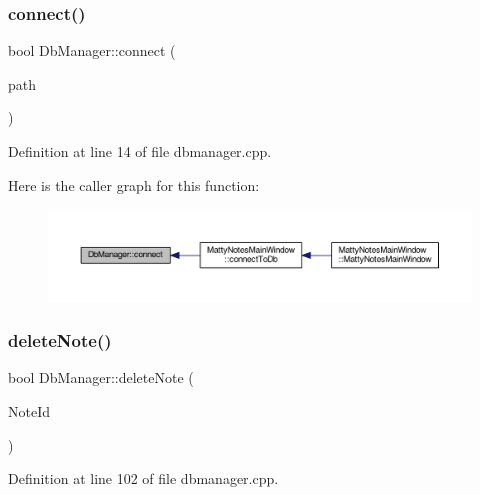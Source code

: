 \subsubsection{\texorpdfstring{connect()}{connect()}}
{\footnotesize\ttfamily bool Db\+Manager\+::connect (\begin{DoxyParamCaption}\item[{const Q\+String \&}]{path }\end{DoxyParamCaption})\hspace{0.3cm}{\ttfamily [static]}}



Definition at line 14 of file dbmanager.\+cpp.

Here is the caller graph for this function\+:
\nopagebreak
\begin{figure}[H]
\begin{center}
\leavevmode
\includegraphics[width=350pt]{classDbManager_abc90b3bf97dda268b4160a0662305898_icgraph}
\end{center}
\end{figure}
\hypertarget{classDbManager_a164849758fd05445c7af2cc04fc3569f}{}\label{classDbManager_a164849758fd05445c7af2cc04fc3569f} 
\subsubsection{\texorpdfstring{delete\+Note()}{deleteNote()}}
{\footnotesize\ttfamily bool Db\+Manager\+::delete\+Note (\begin{DoxyParamCaption}\item[{int}]{Note\+Id }\end{DoxyParamCaption})\hspace{0.3cm}{\ttfamily [static]}}



Definition at line 102 of file dbmanager.\+cpp.

